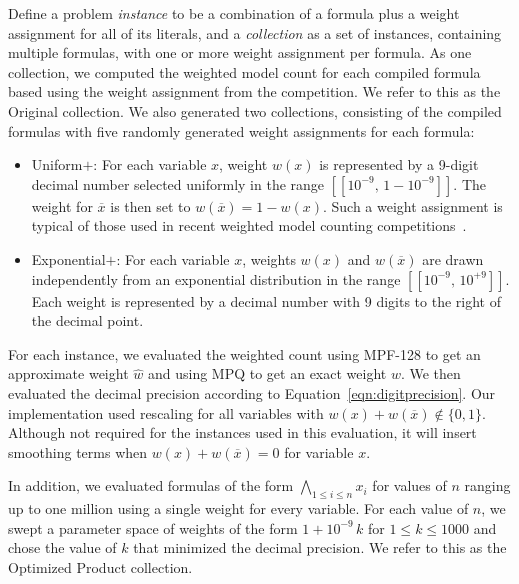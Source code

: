 \documentclass{easychair}
\newcommand{\obar}[1]{\overline{#1}}
\newcommand{\approximate}[1]{\hat{#1}}
\newcommand{\approxw}{\approximate{w}}
\newcommand{\interval}[1]{[\![#1]\!]}
\begin{document}
Define a problem \emph{instance} to be a combination of a formula plus
a weight assignment for all of its literals, and a \emph{collection}
as a set of instances, containing multiple formulas, with one or more
weight assignment per formula.  As one collection, we computed the
weighted model count for each compiled formula based using the weight
assignment from the competition.  We refer to this as the
\textsf{Original} collection.  We also generated two collections,
consisting of the compiled formulas with five randomly generated
weight assignments for each formula:
\begin{itemize}
\item \textsf{Uniform$+$}: For each variable $x$, weight $w(x)$ is represented by a 9-digit decimal number selected uniformly in the range
  $\interval{10^{-9},\,1-10^{-9}}$. The weight for $\obar{x}$ is then set to
  $w(\obar{x}) = 1-w(x)$.  Such a weight assignment is typical of those used in recent weighted model counting competitions~\cite{fichte:jea:2020}.
\item \textsf{Exponential$+$}: For each variable $x$, weights $w(x)$ and $w(\obar{x})$
  are drawn independently from an exponential distribution in the range
  $\interval{10^{-9},\,10^{+9}}$.  Each weight is represented by a decimal number with 9 digits to the right of the decimal point.
\end{itemize}


For each instance, we evaluated
the weighted count using MPF-128
to get an approximate weight $\approxw$ and
using MPQ to get an exact weight $w$.  We then evaluated the decimal precision according to Equation~\ref{eqn:digitprecision}.   Our implementation used rescaling for all variables
with $w(x) + w(\obar{x}) \not \in \{0, 1\}$.
Although not required for the instances used in this evaluation,
it will insert smoothing terms when $w(x) + w(\obar{x}) = 0$ for variable $x$.

In addition, we evaluated formulas of the form $\bigwedge_{1\leq i
  \leq n} x_i$ for values of $n$ ranging up to one million using a
single weight for every variable.  For each value of $n$, we swept a parameter space of
weights of the form $1 + 10^{-9}\,k$ for $1 \leq k \leq 1000$ and
chose the value of $k$ that minimized the decimal precision.  We refer
to this as the \textsf{Optimized Product} collection.
\end{document}
